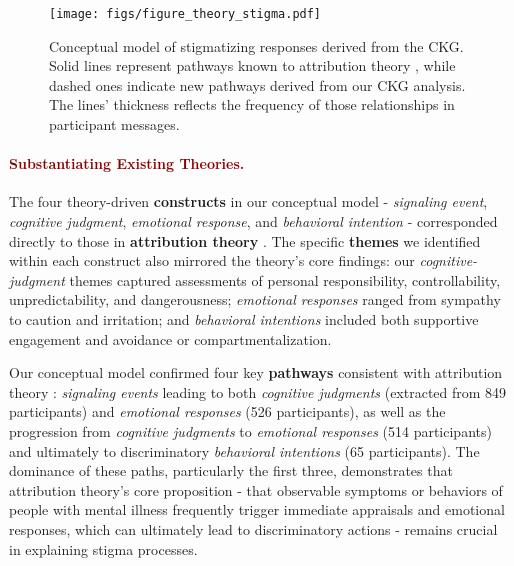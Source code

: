 \begin{figure*}
\centering
\texttt{[image: figs/figure\_theory\_stigma.pdf]}
\caption{Conceptual model of stigmatizing responses derived from the CKG. Solid lines represent pathways known to attribution theory \cite{attribution_theory_corrigan_2000}, while dashed ones indicate new pathways derived from our CKG analysis. The lines' thickness reflects the frequency of those relationships in participant messages.}
\label{fig:theory_stigma}
\end{figure*}





\paragraph{\textcolor{darkred}{\textbf{Substantiating Existing Theories.}}}

The four theory-driven \textbf{constructs} in our conceptual model - \textit{signaling event}, \textit{cognitive judgment}, \textit{emotional response}, and \textit{behavioral intention} - corresponded directly to those in \textbf{attribution theory} \cite{attribution_theory_corrigan_2000}. 
The specific \textbf{themes} we identified within each construct also mirrored the theory's core findings: our \textit{cognitive-judgment} themes captured assessments of personal responsibility, controllability, unpredictability, and dangerousness; \textit{emotional responses} ranged from sympathy to caution and irritation; and \textit{behavioral intentions} included both supportive engagement and avoidance or compartmentalization.

Our conceptual model confirmed four key \textbf{pathways} consistent with attribution theory \cite{attribution_model_corrigan_2003}: \textit{signaling events} leading to both \textit{cognitive judgments} (extracted from 849 participants) and \textit{emotional responses} (526 participants), as well as the progression from \textit{cognitive judgments} to \textit{emotional responses} (514 participants) and ultimately to discriminatory \textit{behavioral intentions} (65 participants).
The dominance of these paths, particularly the first three, demonstrates that attribution theory's core proposition - that observable symptoms or behaviors of people with mental illness frequently trigger immediate appraisals and emotional responses, which can ultimately lead to discriminatory actions - remains crucial in explaining stigma processes.


